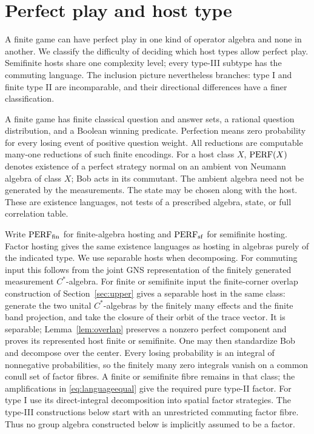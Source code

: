 
\section{Perfect play and host type}\label{sec:intro}
A finite game can have perfect play in one kind of operator algebra
and none in another. We classify the difficulty of deciding which
host types allow perfect play. Semifinite hosts share one complexity
level; every type-III subtype has the commuting language. The
inclusion picture nevertheless branches: type I and finite type II
are incomparable, and their directional differences have a finer
classification.

A finite game has finite classical question and answer sets, a rational
question distribution, and a Boolean winning predicate. Perfection means
zero probability for every losing event of positive question weight.
All reductions are computable many-one reductions of such finite encodings.
For a host class $X$, $\mathrm{PERF}(X)$ denotes existence of a perfect strategy
normal on an ambient von Neumann algebra of class $X$; Bob acts in its
commutant. The ambient algebra need not be generated by the measurements.
The state may be chosen along with the host. These are existence languages,
not tests of a prescribed algebra, state, or full correlation table.

Write $\mathrm{PERF}_{\mathrm{fin}}$ for finite-algebra hosting and $\mathrm{PERF}_{\mathrm{sf}}$
for semifinite hosting. Factor hosting gives the same existence languages
as hosting in algebras purely of the indicated type. We use separable hosts when decomposing. For commuting input this
follows from the joint GNS representation of the finitely generated
measurement $C^*$-algebra. For finite or semifinite input the
finite-corner overlap construction of Section~\ref{sec:upper}
gives a separable host in the same class: generate the two unital
$C^*$-algebras by the finitely many effects and the finite band
projection, and take the closure of their orbit of the trace vector.
It is separable; Lemma~\ref{lem:overlap} preserves a nonzero perfect
component and proves its represented host finite or semifinite.
One may then standardize Bob and decompose over the center.
Every losing probability is an integral of nonnegative probabilities,
so the finitely many zero integrals vanish on a common conull set
of factor fibres. A finite or semifinite fibre remains in that class;
the amplifications in \eqref{eq:languageequal} give the required
pure type-II factor. For type I use its direct-integral decomposition
into spatial factor strategies. The type-III constructions below
start with an unrestricted commuting factor fibre. Thus no group algebra constructed below is implicitly assumed to
be a factor.

